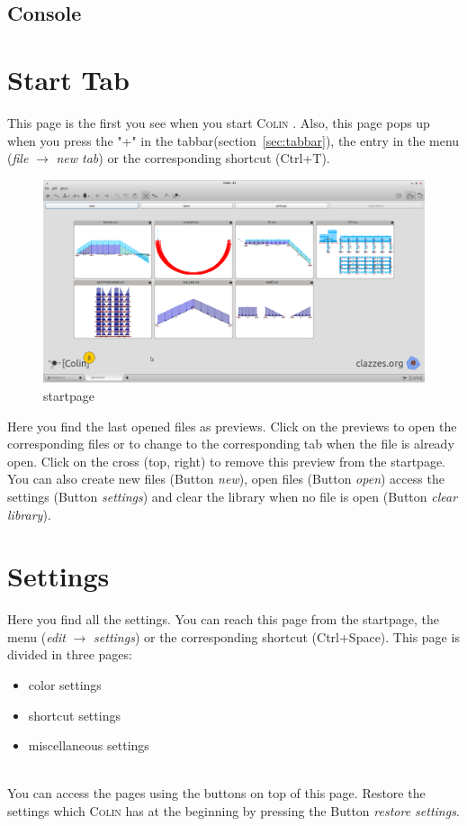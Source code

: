 \documentclass[a4paper,11pt]{report}
\newcommand{\Colin}[0]{\textsc{Colin }}
\begin{document}
\subsection{Console}
\label{ssec:console}


\section{Start Tab}
\label{sec:starttab}

This page is the first you see when you start \Colin. Also, this page pops up when you press the "+" in the tabbar(section~\ref{sec:tabbar}), the entry in the menu (\textit{file} $\rightarrow$ \textit{new tab}) or the corresponding shortcut (Ctrl+T). 
\begin{figure}[H]
\includegraphics[width=\textwidth]{../pictures/startpage.png}
\caption{startpage}
\label{pic:startpage}
\end{figure}
Here you find the last opened files as previews. Click on the previews to open the corresponding files or to change to the corresponding tab when the file is already open. Click on the cross (top, right) to remove this preview from the startpage. You can also create new files (Button \textit{new}), open files (Button \textit{open}) access the settings (Button \textit{settings}) and clear the library when no file is open (Button \textit{clear library}).

\section{Settings}
\label{sec:settings}
Here you find all the settings. You can reach this page from the startpage, the menu (\textit{edit} $\rightarrow$ \textit{settings}) or the corresponding shortcut (Ctrl+Space). This page is divided in three pages:
\begin{itemize}
	\item color settings
	\item shortcut settings
	\item miscellaneous settings
\end{itemize}\\
You can access the pages using the buttons on top of this page. Restore the settings which \Colin has at the beginning by pressing the Button \textit{restore settings}. 
\end{document}
